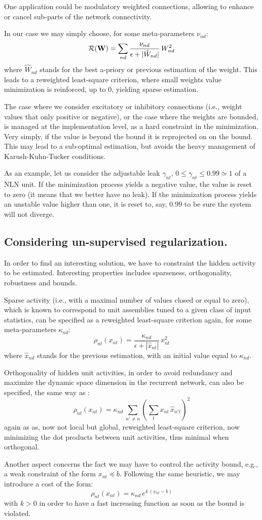 One application could be modulatory weighted connections, allowing to enhance or cancel sub-parts of the network connectivity.

In our case we may simply choose, for some meta-parameters $\nu_{nd}$: 
\[
{\cal R}({\bf W}) = \sum_{nd} \frac{\nu_{nd}}{\epsilon + |\hat{W}_{nd}|} \, W_{nd}^2
\]
where $\hat{W}_{nd}$ stands for the best a-priory or previous estimation of the weight. This leads to a reweighted least-square criterion, where small weights value minimization is reinforced, up to $0$, yielding sparse estimation.

The case where we consider excitatory or inhibitory connections (i.e., weight values that only positive or negative), or the case where the weights are bounded, is managed at the implementation level, as a hard constraint in the minimization. Very simply, if the value is beyond the bound it is reprojected on on the bound. This may lead to a sub-optimal estimation, but avoids the heavy management of Karush-Kuhn-Tucker conditions.

As an example, let us consider the adjustable leak $\gamma_{nt}$, $0 \leq \gamma_{nt} \leq 0.99 \simeq 1$ of a NLN unit. If the minimization process yields a negative value, the value is reset to zero (it means that we better have no leak). If the minimization process yields an unstable value higher than one, it is reset to, say, $0.99$ to be sure the system will not diverge.

\subsection*{Considering un-supervised regularization.}

In order to find an interesting solution, we have to constraint the hidden activity to be estimated. Interesting properties includes sparseness, orthogonality, robustness and bounds.

Sparse activity (i.e., with a maximal number of values closed or equal to zero), which is known to correspond to unit assemblies tuned to a given class of input statistics, can be specified as a reweighted least-square criterion again, for some meta-parameters $\kappa_{nd}$:
\[
\rho_{nt}(x_{nt}) = \frac{\kappa_{nd}}{\epsilon + |\hat{x}_{nt}|} \, x_{nt}^2
\]
where $\hat{x}_{nd}$ stands for the previous estimation, with an initial value equal to $\kappa_{nd}$.

Orthogonality of hidden unit activities, in order to avoid redundancy and maximize the dynamic space dimension in the recurrent network, can also be specified, the same way as :
\[
\rho_{nt}(x_{nt}) = \kappa_{nd} \, \sum_{n' \neq n} (\sum_t x_{nt} \, \hat{x}_{n't})^2
\]
again as as, now not local but global, reweighted least-square criterion, now minimizing the dot products between unit activities, thus minimal when orthogonal. 

Another aspect concerns the fact we may have to control the activity bound, e.g., a weak constraint of the form $x_{nt} \preceq b$. Following the same heuristic, we may introduce a cost of the form:
\[
\rho_{nt}(x_{nt}) = \kappa_{nd} \, e^{k\,(x_{nt} - b)}
\]
with $k > 0$ in order to have a fast increasing function as soon as the bound is violated.
